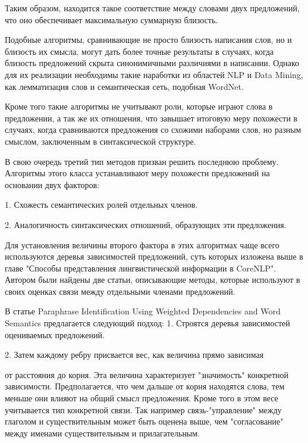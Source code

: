 Таким образом, находится такое соответствие между словами двух предложений,
что оно обеспечивает максимальную суммарную близость.

Подобные алгоритмы, сравнивающие не просто близость написания слов, 
но и близость их смысла, могут дать более точные результаты в случаях, 
когда близость предложений скрыта синонимичными различиями в написании.
Однако для их реализации необходимы такие наработки из областей NLP и Data Mining, 
как лемматизация слов и семантическая сеть, подобная WordNet\cite{wordnet}.


Кроме того такие алгоритмы не учитывают роли, которые играют слова в предложении,
а так же их отношения, что завышает итоговую меру похожести в случаях,
когда сравниваются предложения со схожими наборами слов, но разным смыслом,
заключенным в синтаксической структуре.

В свою очередь третий тип методов призван решить последнюю проблему. 
Алгоритмы этого класса устанавливают меру похожести предложений на основании двух факторов:

1. Схожесть семантических ролей отдельных членов.

2. Аналогичность синтаксических отношений, образующих эти предложения.

Для установления величины второго фактора в этих алгоритмах чаще всего используются
деревья зависимостей предложений, суть которых изложена выше в главе "Способы представления лингвистической информации в CoreNLP".
Автором были найдены две статьи, описывающие методы, 
которые используют в своих оценках связи между отдельными членами предложений.

В статье Paraphrase Identification Using Weighted Dependencies and Word Semantics\cite{weightedDep}
предлагается следующий подход:
1. Строятся деревья зависимостей оцениваемых предложений.

2. Затем каждому ребру присвается вес, как величина прямо зависимая

от расстояния до корня. Эта величина характеризует "значимость" конкретной зависимости.
Предполагается, что чем дальше от корня находятся слова, тем меньше они влияют
на общий смысл предложения. Кроме того в этом весе учитывается тип конкретной связи.
Так например связь-"управление" между глаголом и существительным
может быть оценена выше, чем "согласование" между именами существительным и прилагательным.

